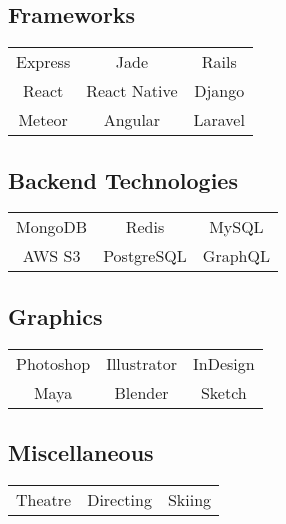 \documentclass[letterpaper]{deedy-resume} %
\begin{document}
\begin{minipage}[t]{0.33\textwidth}
  \vspace{4mm}

  \subsection{Frameworks}

  \begin{tabular}{ c c c }
    Express & Jade & Rails \\
    React & React Native & Django \\
    Meteor & Angular & Laravel
  \end{tabular}

  \vspace{4mm}

  \subsection{Backend Technologies}

  \begin{tabular}{ c c c }
    MongoDB & Redis & MySQL \\
    AWS S3 & PostgreSQL & GraphQL
  \end{tabular}

  \vspace{4mm}

  \subsection{Graphics}

  \begin{tabular}{ c c c }
    Photoshop & Illustrator & InDesign \\
    Maya & Blender & Sketch
  \end{tabular}

  \vspace{4mm}

  \subsection{Miscellaneous}

  \begin{tabular}{ c c c }
    Theatre & Directing & Skiing
  \end{tabular}

  
  \sectionspace %



\end{minipage} %
\end{document}

